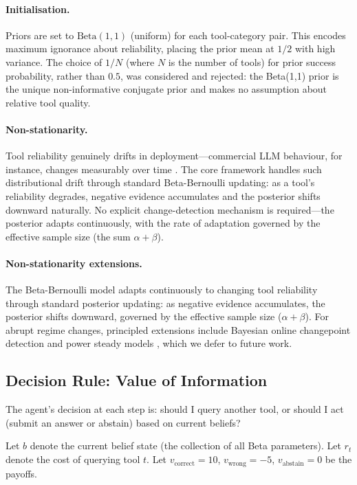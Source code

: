 \documentclass[11pt]{article}
\newcommand{\Beta}{\mathrm{Beta}}
\begin{document}
\paragraph{Initialisation.} Priors are set to $\Beta(1, 1)$ (uniform) for each tool-category pair. This encodes maximum ignorance about reliability, placing the prior mean at $1/2$ with high variance. The choice of $1/N$ (where $N$ is the number of tools) for prior success probability, rather than $0.5$, was considered and rejected: the Beta(1,1) prior is the unique non-informative conjugate prior and makes no assumption about relative tool quality.

\paragraph{Non-stationarity.} Tool reliability genuinely drifts in deployment---commercial LLM behaviour, for instance, changes measurably over time \citep{chen2023chatgpt}. The core framework handles such distributional drift through standard Beta-Bernoulli updating: as a tool's reliability degrades, negative evidence accumulates and the posterior shifts downward naturally. No explicit change-detection mechanism is required---the posterior adapts continuously, with the rate of adaptation governed by the effective sample size (the sum $\alpha + \beta$).

\paragraph{Non-stationarity extensions.} The Beta-Bernoulli model adapts continuously to changing tool reliability through standard posterior updating: as negative evidence accumulates, the posterior shifts downward, governed by the effective sample size ($\alpha + \beta$). For abrupt regime changes, principled extensions include Bayesian online changepoint detection \citep{adams2007changepoint} and power steady models \citep{freeman2011dynamic}, which we defer to future work.

\subsection{Decision Rule: Value of Information}
\label{sec:voi}

The agent's decision at each step is: should I query another tool, or should I act (submit an answer or abstain) based on current beliefs?

Let $b$ denote the current belief state (the collection of all Beta parameters). Let $r_t$ denote the cost of querying tool $t$. Let $v_{\text{correct}} = 10$, $v_{\text{wrong}} = -5$, $v_{\text{abstain}} = 0$ be the payoffs.
\end{document}
